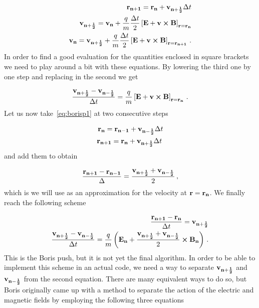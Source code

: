 \documentclass[12pt, class=report, crop=false]{standalone}
\begin{document}
\begin{subequations}
  \begin{align}
    \label{eq:borisp1}
    \vb{r_{n+1}} = \vb{r_n} + \vb{v_{n+\frac{1}{2}}} \Delta t\\
    \label{eq:borisp2}
    \vb{v_{n+\frac{1}{2}}} = \vb{v_n} +\frac{q}{m} \frac{\Delta t}{2} \left[\vb{E} + \vb{v} \cp \vb{B} \right]_{\vb{r} = \vb{r_n}}\\
    \vb{v_{n}} = \vb{v_{n+\frac{1}{2}}} +\frac{q}{m} \frac{\Delta t}{2} \left[\vb{E} + \vb{v} \cp \vb{B} \right]_{\vb{r} = \vb{r_{n+1}}}\,.
  \end{align}
\end{subequations}
In order to find a good evaluation for the quantities enclosed in square brackets we need to play around a bit with these equations. By lowering the third one by one step and replacing in the second we get

\begin{equation}
  \frac{\vb{v_{n+\frac{1}{2}}} - \vb{v_{n-\frac{1}{2}}} }{\Delta t} = \frac{q}{m} \left[\vb{E} + \vb{v} \cp \vb{B} \right]_{\vb{r} = \vb{r_n}}\,.
\end{equation}
Let us now take~\cref{eq:borisp1} at two consecutive steps

\begin{subequations}
  \begin{align}
    \vb{r_{n}} = \vb{r_{n-1}} + \vb{v_{n-\frac{1}{2}}} \Delta t\\
    \vb{r_{n+1}} = \vb{r_n} + \vb{v_{n+\frac{1}{2}}} \Delta t\,
  \end{align}
\end{subequations}
and add them to obtain

\begin{equation}
  \frac{\vb{r_{n+1}} - \vb{r_{n-1}}}{\Delta} = \frac{\vb{v_{n+\frac{1}{2}}} + \vb{v_{n-\frac{1}{2}}}}{2}\,,
\end{equation}
which is we will use as an approximation for the velocity at \(\vb{r} = \vb{r_n}\). We finally reach the following scheme

\begin{subequations}
\label{eq:actual-boris1}
  \begin{align}
    \label{eq:actual-boris11}
    \frac{\vb{r_{n+1}} - \vb{r_n}}{\Delta t} = \vb{v_{n+\frac{1}{2}}}\\
    \label{eq:actual-boris12}
    \frac{\vb{v_{n+\frac{1}{2}}} - \vb{v_{n-\frac{1}{2}}} }{\Delta t} = \frac{q}{m} \left(\vb{E_n} + \frac{\vb{v_{n+\frac{1}{2}}} + \vb{v_{n-\frac{1}{2}}}}{2} \cp \vb{B_n} \right)\,.
  \end{align}
\end{subequations}
This is the Boris push, but it is not yet the final algorithm. In order to be able to implement this scheme in an actual code, we need a way to separate \(\vb{v_{n+\frac{1}{2}}}\) and \(\vb{v_{n-\frac{1}{2}}}\) from the second equation. There are many equivalent ways to do so, but Boris originally came up with a method to separate the action of the electric and magnetic fields by employing the following three equations
\end{document}

